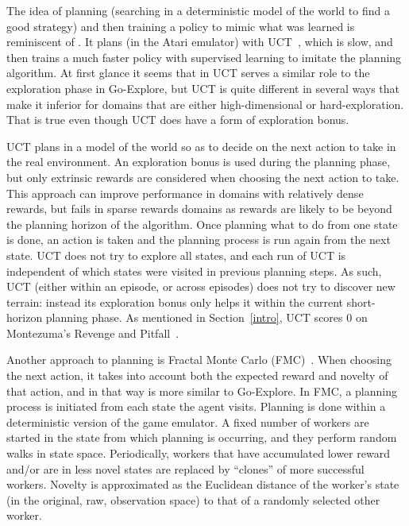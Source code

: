 \documentclass{article}
\begin{document}
The idea of planning (searching in a deterministic model of the world to find a good strategy) and then training a policy to mimic what was learned is reminiscent of \citet{Guo2014DeepLF}. It plans (in the Atari emulator) with UCT~\cite{Kocsis2006BanditBM,Kocsis2006ImprovedMS,Browne2012ASO}, which is slow, and then trains a much faster policy with supervised learning to imitate the planning algorithm. At first glance it seems that in \citet{Guo2014DeepLF} UCT serves a similar role to the exploration phase in Go-Explore, but UCT is quite different in several ways that make it inferior for domains that are either high-dimensional or hard-exploration. That is true even though UCT does have a form of exploration bonus.

UCT plans in a model of the world so as to decide on the next action to take in the real environment. An exploration bonus is used during the planning phase, but only extrinsic rewards are considered when choosing the next action to take. This approach can improve performance in domains with relatively dense rewards, but fails in sparse rewards domains as rewards are likely to be beyond the planning horizon of the algorithm. Once planning what to do from one state is done, an action is taken and the planning process is run again from the next state. UCT does not try to explore all states, and each run of UCT is independent of which states were visited in previous planning steps. As such, UCT (either within an episode, or across episodes) does not try to discover new terrain: instead its exploration bonus only helps it within the current short-horizon planning phase. As mentioned in Section~\ref{intro}, UCT scores 0 on Montezuma's Revenge and Pitfall~\cite{bellemare2013arcade,Lipovetzky2015ClassicalPW}.

Another approach to planning is Fractal Monte Carlo (FMC)~\cite{Cerezo2018FractalAA}. When choosing the next action, it takes into account both the expected reward and novelty of that action, and in that way is more similar to Go-Explore. In FMC, a planning process is initiated from each state the agent visits. Planning is done within a deterministic version of the game emulator. A fixed number of workers are started in the state from which planning is occurring, and they perform random walks in state space. Periodically, workers that have accumulated lower reward and/or are in less novel states are replaced by ``clones'' of more successful workers. Novelty is approximated as the Euclidean distance of the worker's state (in the original, raw, observation space) to that of a randomly selected other worker. 
\end{document}
